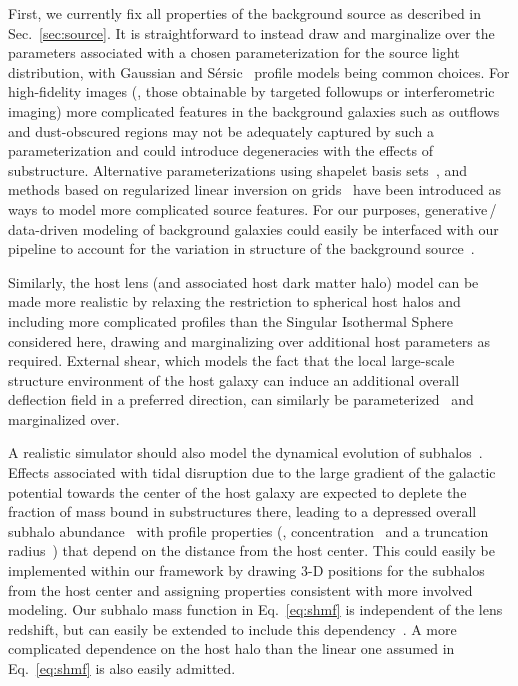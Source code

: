 \documentclass[twocolumn]{aastex62}
\begin{document}
First, we currently fix all properties of the background source as described in Sec.~\ref{sec:source}. It is straightforward to instead draw and marginalize over the parameters associated with a chosen parameterization for the source light distribution, with Gaussian and S\'{e}rsic~\citep{1963BAAA....6...41S} profile models being common choices. For high-fidelity images (\eg, those obtainable by targeted followups or interferometric imaging) more complicated features in the background galaxies such as outflows and dust-obscured regions may not be adequately captured by such a parameterization and could introduce degeneracies with the effects of substructure. Alternative parameterizations using shapelet basis sets~\citep{1803.09746, 1504.07629}, and methods based on regularized linear inversion on grids~\citep{1708.07377, astro-ph/0601493,2003ApJ...590..673W} have been introduced as ways to model more complicated source features. For our purposes, generative\,/\,data-driven modeling of background galaxies could easily be interfaced with our pipeline to account for the variation in structure of the background source~\citep{1901.01359}.

Similarly, the host lens (and associated host dark matter halo) model can be made more realistic by relaxing the restriction to spherical host halos and including more complicated profiles than the Singular Isothermal Sphere considered here, drawing and marginalizing over additional host parameters as required. External shear, which models the fact that the local large-scale structure environment of the host galaxy can induce an additional overall deflection field in a preferred direction, can similarly be parameterized~\citep{1997MNRAS.292..673S,astro-ph/9610163} and marginalized over.

A realistic simulator should also model the dynamical evolution of subhalos~\citep{2017MNRAS.469.1997D}. Effects associated with tidal disruption due to the large gradient of the galactic potential towards the center of the host galaxy are expected to deplete the fraction of mass bound in substructures there, leading to a depressed overall subhalo abundance~\citep{2016MNRAS.457.1208H} with profile properties (\eg, concentration~\citep{1603.04057} and a truncation radius~\citep{0705.0682}) that depend on the distance from the host center. This could easily be implemented within our framework by drawing 3-D positions for the subhalos from the host center and assigning properties consistent with more involved modeling. Our subhalo mass function in Eq.~\eqref{eq:shmf} is independent of the lens redshift, but can easily be extended to include this dependency~\citep{2018PhRvD..97l3002H,2017MNRAS.469.1997D}. A more complicated dependence on the host halo than the linear one assumed in Eq.~\eqref{eq:shmf} is also easily admitted.
\end{document}
